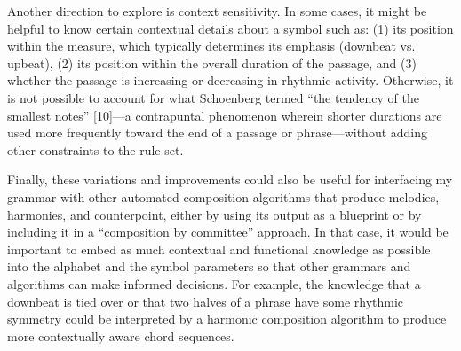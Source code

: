 \documentclass{article}
\begin{document}
Another direction to explore is context sensitivity. In some cases, it might be helpful to know certain contextual details about a symbol such as: (1) its position within the measure, which typically determines its emphasis (downbeat vs. upbeat), (2) its position within the overall duration of the passage, and (3) whether the passage is increasing or decreasing in rhythmic activity. Otherwise, it is not possible to account for what Schoenberg termed “the tendency of the smallest notes” [10]—a contrapuntal phenomenon wherein shorter durations are used more frequently toward the end of a passage or phrase—without adding other constraints to the rule set.

Finally, these variations and improvements could also be useful for interfacing my grammar with other automated composition algorithms that produce melodies, harmonies, and counterpoint, either by using its output as a blueprint or by including it in a “composition by committee” approach. In that case, it would be important to embed as much contextual and functional knowledge as possible into the alphabet and the symbol parameters so that other grammars and algorithms can make informed decisions. For example, the knowledge that a downbeat is tied over or that two halves of a phrase have some rhythmic symmetry could be interpreted by a harmonic composition algorithm to produce more contextually aware chord sequences.


\end{document}

